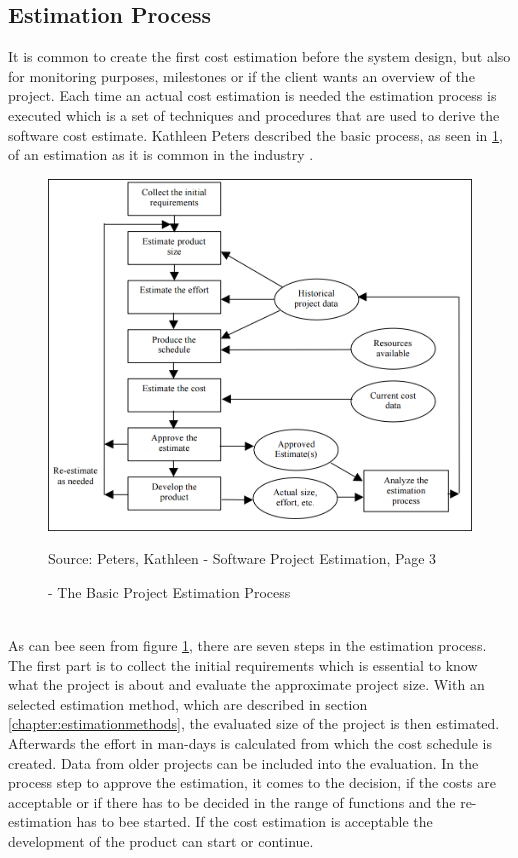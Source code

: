 \subsection{Estimation Process}

It is common to create the first cost estimation before the system design, but also for monitoring purposes, milestones or if the client wants an overview of the project. Each time an actual cost estimation is needed the estimation process is executed which is a set of techniques and procedures that are used to derive the software cost estimate. Kathleen Peters described the basic process, as seen in \ref{fig:basicEstimationProcess}, of an estimation as it is common in the industry \cite{estimationProcess}.\\
\begin{figure}[h] 
	\centering 
	\includegraphics[width=13cm]{images/estimationProcess.PNG} 
	\caption{- The Basic Project Estimation Process}
	Source: Peters, Kathleen - Software Project Estimation, Page 3  
	\label{fig:basicEstimationProcess}
\end{figure}\\
As can bee seen from figure \ref{fig:basicEstimationProcess}, there are seven steps in the estimation process. The first part is to collect the initial requirements which is essential to know what the project is about and evaluate the approximate project size. With an selected estimation method, which are described in section \ref{chapter:estimationmethods}, the evaluated size of the project is then estimated. Afterwards the effort in man-days is calculated from which the cost schedule is created. Data from older projects can be included into the evaluation. In the process step to approve the estimation, it comes to the decision, if the costs are acceptable or if there has to be decided in the range of functions and the re-estimation has to bee started. If the cost estimation is acceptable the development of the product can start or continue.\\
